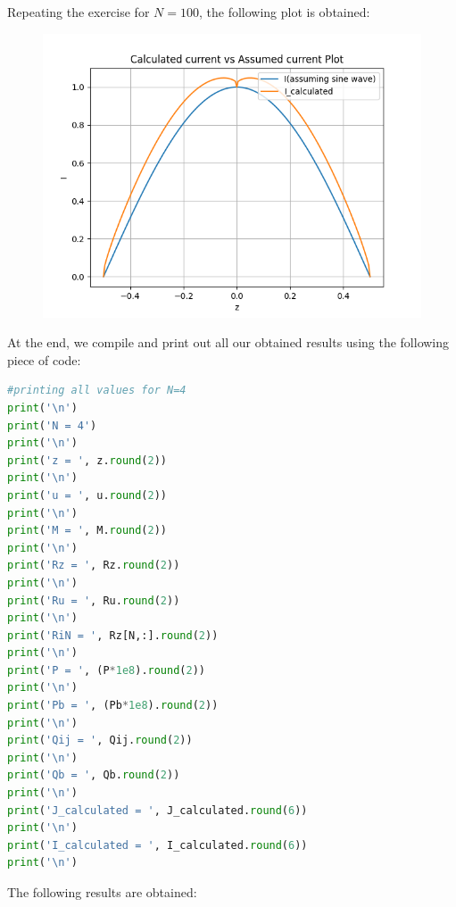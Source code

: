 \documentclass[11pt, a4paper]{article}
\begin{document}
Repeating the exercise for $N=100$, the following plot is obtained:

\begin{figure}[H]
     \centering
     \includegraphics[scale=0.8]{Figure_2.png}
\end{figure}

At the end, we compile and print out all our obtained results using the following piece of code:\\

\begin{lstlisting}[language = Python]
#printing all values for N=4
print('\n')
print('N = 4')
print('\n')
print('z = ', z.round(2))
print('\n')
print('u = ', u.round(2))
print('\n')
print('M = ', M.round(2))
print('\n')
print('Rz = ', Rz.round(2))
print('\n')
print('Ru = ', Ru.round(2))
print('\n')
print('RiN = ', Rz[N,:].round(2))
print('\n')
print('P = ', (P*1e8).round(2))
print('\n')
print('Pb = ', (Pb*1e8).round(2))
print('\n')
print('Qij = ', Qij.round(2))
print('\n')
print('Qb = ', Qb.round(2))
print('\n')
print('J_calculated = ', J_calculated.round(6))
print('\n')
print('I_calculated = ', I_calculated.round(6))
print('\n')


\end{lstlisting}

The following results are obtained:
\end{document}
